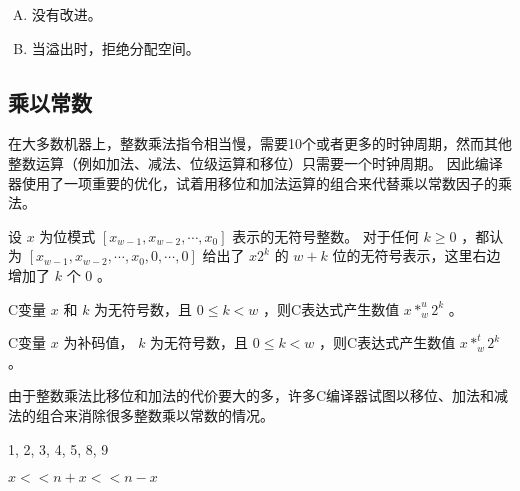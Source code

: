{{        %
        \begin{practicec}

        \end{practicec}

        \begin{practicec}
            \begin{enumerate}[A.]
                \item 没有改进。
                \item 当溢出时，拒绝分配空间。
            \end{enumerate}
        \end{practicec}
    }

    \subsection{乘以常数}
    {
        在大多数机器上，整数乘法指令相当慢，需要10个或者更多的时钟周期，然而其他整数运算（例如加法、减法、位级运算和移位）只需要一个时钟周期。
        因此编译器使用了一项重要的优化，试着用移位和加法运算的组合来代替乘以常数因子的乘法。

        \begin{defines}[乘以2的幂]
            设 $x$ 为位模式 $[x_{w - 1}, x_{w - 2}, \cdots, x_0]$ 表示的无符号整数。
            对于任何 $k \geq 0$ ，都认为 $[x_{w - 1}, x_{w - 2}, \cdots, x_0, 0, \cdots, 0]$ 给出了 $x2^k$ 的 $w + k$ 位的无符号表示，这里右边增加了 $k$ 个 $0$ 。
        \end{defines}

        \begin{defines}[与2的幂相乘的无符号乘法]
            C变量 $x$ 和 $k$ 为无符号数，且 $0 \leq k < w$ ，则C表达式产生数值 $x *_w^u 2^k$ 。
        \end{defines}

        \begin{defines}[与2的幂相乘的补码乘法]
            C变量 $x$ 为补码值， $k$ 为无符号数，且 $0 \leq k < w$ ，则C表达式产生数值 $x *_w^t 2^k$ 。
        \end{defines}

        由于整数乘法比移位和加法的代价要大的多，许多C编译器试图以移位、加法和减法的组合来消除很多整数乘以常数的情况。

        \begin{practicec}
            1, 2, 3, 4, 5, 8, 9
        \end{practicec}

        \begin{practicec}
            $x << n + x << n - x$
        \end{practicec}

}}
